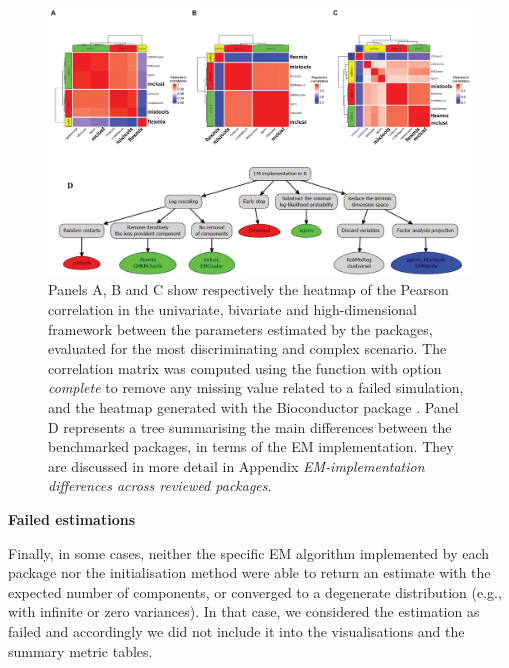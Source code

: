 \begin{figure}

{\centering \includegraphics[width=1\linewidth]{./figures/dichotomy_package_conclusion} 

}

\caption{Panels A, B and C show respectively the heatmap of the Pearson correlation in the univariate, bivariate and high-dimensional framework between the parameters estimated by the packages, evaluated for the most discriminating and complex scenario. The correlation matrix was computed using the function  with option \textit{complete} to remove any missing value related to a failed simulation, and the heatmap generated with the Bioconductor package . Panel D represents a tree summarising the main differences between the benchmarked packages, in terms of the EM implementation. They are discussed in more detail in Appendix \textit{EM-implementation differences across reviewed packages}.}\label{fig:dichotomy-package-conclusion}
\end{figure}

\textbf{Failed estimations}

Finally, in some cases, neither the specific EM algorithm implemented by each package nor the initialisation method were able to return an estimate with the expected number of components, or converged to a degenerate distribution (e.g., with infinite or zero variances). In that case, we considered the estimation as failed and accordingly we did not include it into the visualisations and the summary metric tables.

